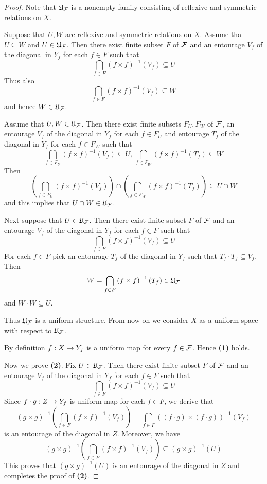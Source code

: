 \begin{proof}
	Note that ${\mathfrak U}_{{\mathcal F}}$ is a nonempty family consisting of reflexive and symmetric relations on $X$.

	Suppose that $U,W$ are reflexive and symmetric relations on $X$. Assume tha $U\subseteq W$ and $U \in {\mathfrak U}_{{\mathcal F}}$. Then there exist finite subset $F$ of ${\mathcal F}$ and an entourage $V_f$ of the diagonal in $Y_f$ for each $f\in F$ such that
	$$\bigcap_{f\in F}\left(f\times f\right)^{-1}(V_f) \subseteq U$$
	Thus also
	$$\bigcap_{f\in F}\left(f\times f\right)^{-1}(V_f) \subseteq W$$
	and hence $W \in {\mathfrak U}_{{\mathcal F}}$.

	Assume that $U,W \in {\mathfrak U}_{{\mathcal F}}$. Then there exist finite subsets $F_U,F_W$ of ${\mathcal F}$, an entourage $V_f$ of the diagonal in $Y_f$ for each $f\in F_U$ and entourage $T_f$ of the diagonal in $Y_f$ for each $f\in F_W$ such that
	$$\bigcap_{f\in F_U}\left(f\times f\right)^{-1}(V_f) \subseteq U,\,\bigcap_{f\in F_W}\left(f\times f\right)^{-1}(T_f)\subseteq W$$
	Then
	$$\left(\bigcap_{f\in F_U}\left(f\times f\right)^{-1}(V_f) \right) \cap \left(\bigcap_{f \in F_W}\left(f\times f\right)^{-1}(T_f)\right)\subseteq U\cap W$$
	and this implies that $U\cap W \in {\mathfrak U}_{{\mathcal F}}$.

	Next suppose that $U \in {\mathfrak U}_{{\mathcal F}}$. Then there exist finite subset $F$ of ${\mathcal F}$ and an entourage $V_f$ of the diagonal in $Y_f$ for each $f\in F$ such that
	$$\bigcap_{f\in F}\left(f\times f\right)^{-1}(V_f) \subseteq U$$
	For each $f \in F$ pick an entourage $T_f$ of the diagonal in $Y_f$ such that $T_f\cdot T_f \subseteq V_f$. Then
	$$W = \bigcap_{f \in F}\left(f\times f\right)^{-1}(T_f) \in {\mathfrak U}_{{\mathcal F}}$$
	and $W\cdot W \subseteq U$.

	Thus ${\mathfrak U}_{{\mathcal F}}$ is a uniform structure. From now on we consider $X$ as a uniform space with respect to ${\mathfrak U}_{{\mathcal F}}$.

	By definition $f:X\rightarrow Y_f$ is a uniform map for every $f\in {\mathcal F}$. Hence \textbf{(1)} holds.

	Now we prove \textbf{(2)}. Fix $U \in {\mathfrak U}_{{\mathcal F}}$. Then there exist finite subset $F$ of ${\mathcal F}$ and an entourage $V_f$ of the diagonal in $Y_f$ for each $f\in F$ such that
	$$\bigcap_{f\in F}\left(f\times f\right)^{-1}(V_f) \subseteq U$$
	Since $f\cdot g:Z\rightarrow Y_f$ is uniform map for each $f \in F$, we derive that
	$$\left(g\times g\right)^{-1}\left(\bigcap_{f\in F}\left(f\times f\right)^{-1}\left(V_f\right)\right) = \bigcap_{f\in F}\left((f\cdot g)\times (f\cdot g)\right)^{-1}(V_f)$$
	is an entourage of the diagonal in $Z$. Moreover, we have
	$$\left(g\times g\right)^{-1}\left(\bigcap_{f\in F}\left(f\times f\right)^{-1}\left(V_f\right)\right) \subseteq \left(g\times g\right)^{-1}(U)$$
	This proves that $(g\times g)^{-1}(U)$ is an entourage of the diagonal in $Z$ and completes the proof of \textbf{(2)}.
\end{proof}

